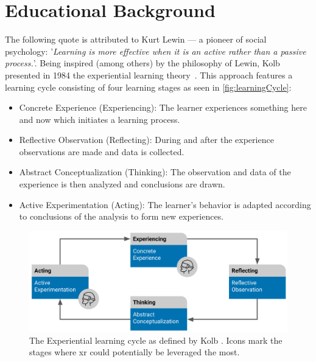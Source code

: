 %
\chapter{Educational Background}
\label{sec:concepts}

The following quote is attributed to Kurt Lewin --- a pioneer of social psychology: '\emph{Learning is more effective when it is an active rather than a passive process.}'. Being inspired (among others) by the philosophy of Lewin, Kolb presented in 1984 the experiential learning theory~\cite{kolb:1984:experiential}.
This approach features a learning cycle consisting of four learning stages as seen in \autoref{fig:learningCycle}:

\begin{itemize}
    \setlength{\itemsep}{-0.3cm}
    \item Concrete Experience (Experiencing): The learner experiences something here and now which initiates a learning process.
    \item Reflective Observation (Reflecting): During and after the experience observations are made and data is collected.
    \item Abstract Conceptualization (Thinking): The observation and data of the experience is then analyzed and conclusions are drawn.
    \item Active Experimentation (Acting): The learner's behavior is adapted according to conclusions of the analysis to form new experiences. 
\end{itemize}

\begin{figure}[h!bt]
	\centering
	\includegraphics[width=0.9\linewidth]{pictures/ExperientialLearningCycle2.png}
	\captionsetup{labelfont=bf,textfont=it}
	\caption{The Experiential learning cycle as defined by Kolb \cite{kolb:1984:experiential}. Icons mark the stages where \acrshort{xr} could potentially be leveraged the most.\label{fig:learningCycle}}
\end{figure}

